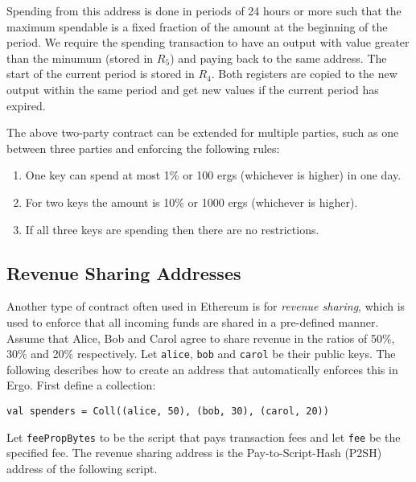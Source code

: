 \documentclass[runningheads]{llncs}
\begin{document}
Spending from this address is done in periods of 24 hours or more such that the maximum spendable is a fixed fraction of the amount at the beginning of the period. We require the spending transaction to have an output with value greater than the minumum (stored in $R_5$) and paying back to the same address. The start of the current period is stored in $R_4$. Both registers are copied to the new output within the same period and get new values if the current period has expired. 

The above two-party contract can be extended for multiple parties, such as one between three parties and enforcing the following rules:

\begin{enumerate}
	\item One key can spend at most 1\% or 100 ergs (whichever is higher) in one day.
	\item For two keys the amount is 10\% or 1000 ergs (whichever is higher).
	\item If all three keys are spending then there are no restrictions. 
\end{enumerate}

\subsection{Revenue Sharing Addresses}
\label{revenue-sharing}

Another type of contract often used in Ethereum is for {\em revenue sharing}, which is used to
enforce that all incoming funds are shared in a pre-defined manner.
Assume that Alice, Bob and Carol agree to share revenue in the ratios of 50\%, 30\% and 20\% respectively. Let \texttt{alice}, \texttt{bob} and \texttt{carol} be their public keys. The following describes how to create an address that automatically enforces this in Ergo. First define a collection: 
\begin{verbatim}
val spenders = Coll((alice, 50), (bob, 30), (carol, 20))
\end{verbatim}

Let \texttt{feePropBytes} to be the script that pays transaction fees and let \texttt{fee} be the specified fee. 
The revenue sharing address is the Pay-to-Script-Hash (P2SH) address of the following script.
\end{document}
